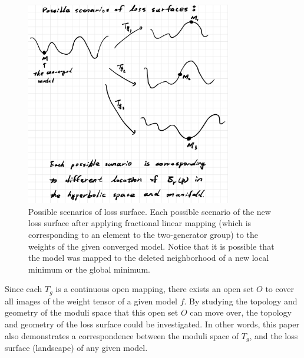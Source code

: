\documentclass{article}
\theoremstyle{plain}
\theoremstyle{plain} %
\theoremstyle{definition}  %
\theoremstyle{remark}  %
\theoremstyle{plain}
\begin{document}
\begin{figure}[H]
\centering
\includegraphics[width=0.8\textwidth]{12.png}
\caption{Possible scenarios of loss surface. Each possible scenario of the new loss surface after applying fractional linear mapping (which is corresponding to an element to the two-generator group) to the weights of the given converged model. Notice that it is possible that the model was mapped to the deleted neighborhood of a new local minimum or the global minimum.}
\end{figure}

Since each $T_g$ is a continuous open mapping, there exists an open set $O$ to cover all images of the weight tensor of a given model $f$. By studying the topology and geometry of the moduli space that this open set $O$ can move over, the topology and geometry of the loss surface could be investigated. In other words, this paper also demonstrates a correspondence between the moduli space of $T_g$\cite{seppala2011geometry, sullivan1979hyperbolic}, and the loss surface (landscape)\cite{li2018visualizing,garipov2018loss, malan2021survey, draxler2018essentially, freeman2016topology, du2019gradient} of any given model.
\end{document}
